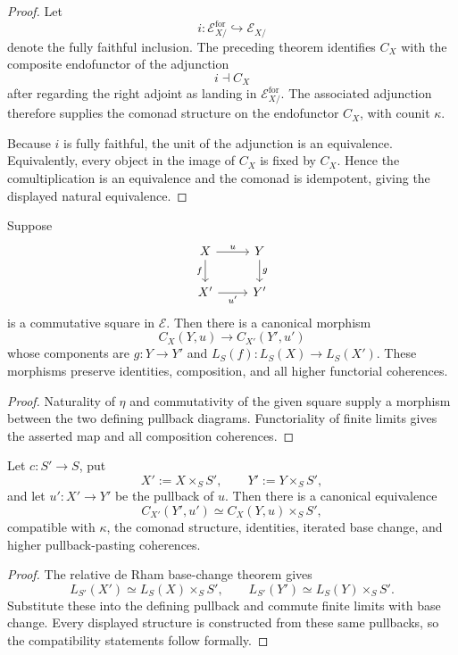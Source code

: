 \begin{proof}
Let
\[
    i:
    \mathcal E^{\mathrm{for}}_{X/}
    \hookrightarrow
    \mathcal E_{X/}
\]
denote the fully faithful inclusion.  The preceding theorem identifies
$C_X$ with the composite endofunctor of the adjunction
\[
    i\dashv C_X
\]
after regarding the right adjoint as landing in
$\mathcal E^{\mathrm{for}}_{X/}$.  The associated adjunction therefore
supplies the comonad structure on the endofunctor $C_X$, with counit
$\kappa$.

Because $i$ is fully faithful, the unit of the adjunction is an equivalence.
Equivalently, every object in the image of $C_X$ is fixed by $C_X$.  Hence
the comultiplication is an equivalence and the comonad is idempotent, giving
the displayed natural equivalence.
\end{proof}

\begin{proposition}
\label{prop:centred-completion-varying-centre}
Suppose
\[
\begin{tikzcd}
X \arrow[r,"u"] \arrow[d,"f"'] &
Y \arrow[d,"g"]\\
X' \arrow[r,"u'"'] &
Y'
\end{tikzcd}
\]
is a commutative square in $\mathcal E$.  Then there is a canonical morphism
\[
    C_X(Y,u)
    \longrightarrow
    C_{X'}(Y',u')
\]
whose components are $g:Y\to Y'$ and
$L_S(f):L_S(X)\to L_S(X')$.  These morphisms preserve identities,
composition, and all higher functorial coherences.
\end{proposition}

\begin{proof}
Naturality of $\eta$ and commutativity of the given square supply a morphism
between the two defining pullback diagrams.  Functoriality of finite limits
gives the asserted map and all composition coherences.
\end{proof}

\begin{proposition}
\label{prop:centred-completion-base-change}
Let $c:S'\to S$, put
\[
    X':=X\times_SS',
    \qquad
    Y':=Y\times_SS',
\]
and let $u':X'\to Y'$ be the pullback of $u$.  Then there is a canonical
equivalence
\[
    C_{X'}(Y',u')
    \simeq
    C_X(Y,u)\times_SS',
\]
compatible with $\kappa$, the comonad structure, identities, iterated base
change, and higher pullback-pasting coherences.
\end{proposition}

\begin{proof}
The relative de Rham base-change theorem gives
\[
    L_{S'}(X')\simeq L_S(X)\times_SS',
    \qquad
    L_{S'}(Y')\simeq L_S(Y)\times_SS'.
\]
Substitute these into the defining pullback and commute finite limits with
base change.  Every displayed structure is constructed from these same
pullbacks, so the compatibility statements follow formally.
\end{proof}

